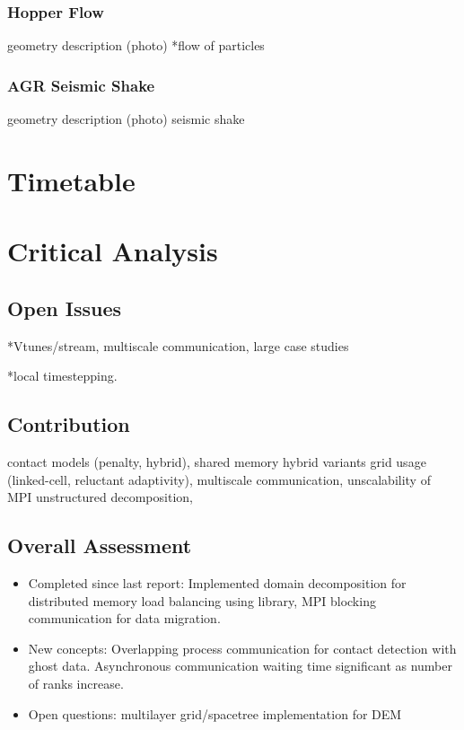 \documentclass[times,12pt]{article}
\begin{document}
\subsubsection{Hopper Flow}

geometry description (photo)
*flow of particles
 

\subsubsection{AGR Seismic Shake}
geometry description (photo)
seismic shake

\section{Timetable}



\section{Critical Analysis}

\subsection{Open Issues}
*Vtunes/stream, multiscale communication, large case studies

*local timestepping. 

\subsection{Contribution}
contact models (penalty, hybrid), 
shared memory hybrid variants
grid usage (linked-cell, reluctant adaptivity), 
multiscale communication, unscalability of MPI unstructured decomposition, 

\subsection{Overall Assessment}



\vspace{5mm}
\begin{itemize}
\item Completed since last report: Implemented domain decomposition for distributed memory load balancing using library, MPI blocking communication for data migration. 
\item New concepts: Overlapping process communication for contact detection with ghost data. Asynchronous communication waiting
time significant as number of ranks increase.
\item Open questions: multilayer grid/spacetree implementation for DEM 
\end{itemize}
\end{document}
